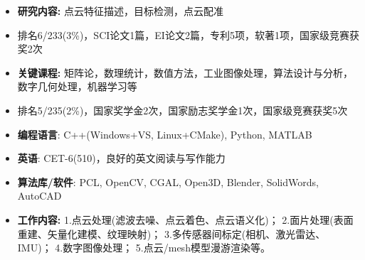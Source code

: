 \begin{itemize}[topsep=0pt, left=1em]
  \item \textbf{研究内容: } 点云特征描述，目标检测，点云配准
  \item 排名6/233(3\%)，SCI论文1篇，EI论文2篇，专利5项，软著1项，国家级竞赛获奖2次
  \item \textbf{关键课程: } 矩阵论，数理统计，数值方法，工业图像处理，算法设计与分析，数字几何处理，机器学习等 %
\end{itemize}

\begin{itemize}[topsep=0pt, left=1em]
  \item 排名5/235(2\%)，国家奖学金2次，国家励志奖学金1次，国家级竞赛获奖5次
\end{itemize}


\begin{itemize}[parsep=0.5ex, label=]
  \item \textbf{编程语言}: 
  C++(Windows+VS, Linux+CMake), Python, MATLAB
  \item \textbf{英语}: 
  CET-6(510)，良好的英文阅读与写作能力
  \item \textbf{算法库/软件}: 
  PCL, OpenCV, CGAL, Open3D, Blender, SolidWords, AutoCAD
\end{itemize}



\begin{itemize}[topsep=0pt, left=1em] %
  \item \textbf{工作内容:} 
  1.点云处理(滤波去噪、点云着色、点云语义化)；
  2.面片处理(表面重建、矢量化建模、纹理映射)；
  3.多传感器间标定(相机、激光雷达、IMU)；
  4.数字图像处理；
  5.点云/mesh模型漫游渲染等。
\end{itemize}

